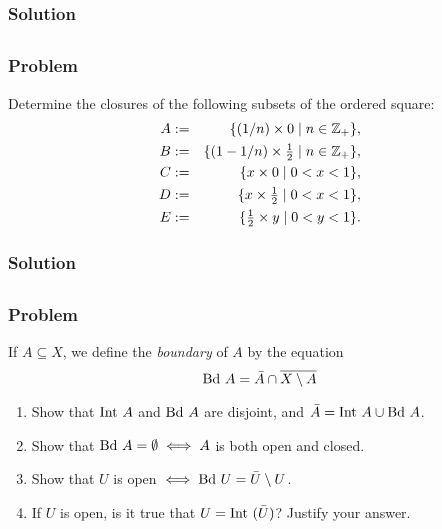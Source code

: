 \subsubsection{Solution}
\todo


\subsection{}

\subsubsection{Problem}
Determine the closures of the following subsets of the ordered square:
\begin{eqnarray*}
    A & := & \{ (1/n) \times 0 \mid n \in \mathbb Z_+ \},\\
    B & := & \{ (1-1/n) \times \tfrac12 \mid n \in \mathbb Z_+ \},\\
    C & := & \{ x \times 0 \mid 0 < x < 1 \},\\
    D & := & \{ x \times \tfrac12 \mid 0 < x < 1 \},\\
    E & := & \{ \tfrac12 \times y \mid 0 < y < 1 \}.
\end{eqnarray*}

\subsubsection{Solution}
\todo


\subsection{}
\subsubsection{Problem}
If $A \subseteq X$, we define the \emph{boundary} of $A$ by the equation
\[\mathrm{Bd\ } A = \bar A \cap \overline{X \setminus A}\]
\begin{enumerate}
\item Show that $\mathrm{Int\ } A$ and $\mathrm{Bd\ } A$ are disjoint, and $\bar A = \mathrm{Int\ } A \cup \mathrm{Bd\ } A$.
\item Show that $\mathrm{Bd\ } A = \emptyset \iff A$ is both open and closed.
\item Show that $U$ is open $\iff \mathrm{Bd\ } U = \bar U \setminus U$.
\item If $U$ is open, is it true that $U = \mathrm{Int\ }(\bar U)$? Justify your answer.
\end{enumerate}

